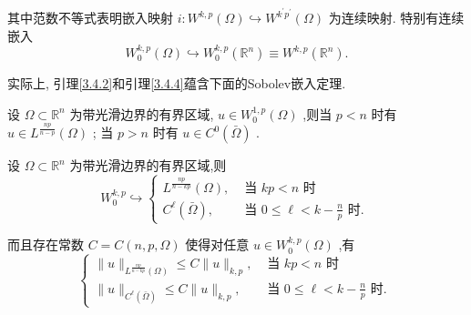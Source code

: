 \documentclass[lang=cn,newtx,10pt,scheme=chinese,thmcnt=chapter]{elegantbook}
\begin{document}
其中范数不等式表明嵌入映射 \(i : {W}^{k,p}\left( \Omega \right)  \hookrightarrow  {W}^{{k}^{\prime }{p}^{\prime }}\left( \Omega \right)\) 为连续映射. 特别有连续嵌入
\begin{equation*}
{W}_{0}^{k,p}\left( \Omega \right)  \hookrightarrow  {W}_{0}^{k,p}\left( {\mathbb{R}}^{n}\right)  \equiv  {W}^{k,p}\left( {\mathbb{R}}^{n}\right) .
\end{equation*}

实际上, 引理\ref{3.4.2}和引理\ref{3.4.4}蕴含下面的Sobolev嵌入定理.
\begin{theorem}\label{3.9}
    设 \(\Omega  \subset  {\mathbb{R}}^{n}\) 为带光滑边界的有界区域, \(u \in  {W}_{0}^{1,p}\left( \Omega \right)\) ,则当 \(p < n\) 时有 \(u \in  {L}^{\frac{np}{n - p}}\left( \Omega \right)\) ; 当 \(p > n\) 时有 \(u \in  {C}^{0}\left( \bar{\Omega }\right)\) .
\end{theorem}
\begin{theorem}
      设 \(\Omega  \subset  {\mathbb{R}}^{n}\) 为带光滑边界的有界区域,则
\begin{equation*}
{W}_{0}^{k,p} \hookrightarrow  \left\{  \begin{array}{ll} {L}^{\frac{np}{n - {kp}}}\left( \Omega \right) , & \text{ 当 }{kp} < n\text{ 时 } \\  {C}^{\ell }\left( \bar{\Omega }\right) , & \text{ 当 }0 \leqslant  \ell  < k - \frac{n}{p}\text{ 时. } \end{array}\right.
\end{equation*}

而且存在常数 \(C = C\left( {n,p,\Omega }\right)\) 使得对任意 \(u \in  {W}_{0}^{k,p}\left( \Omega \right)\) ,有
\begin{equation*}
\left\{  \begin{array}{ll} \parallel u{\parallel }_{{L}^{\frac{np}{n - {kp}}}\left( \Omega \right) } \leqslant  C\parallel u{\parallel }_{k,p}, & \text{ 当 }{kp} < n\text{ 时 } \\  \parallel u{\parallel }_{{C}^{\ell }\left( \bar{\Omega }\right) } \leqslant  C\parallel u{\parallel }_{k,p}, & \text{ 当 }0 \leqslant  \ell  < k - \frac{n}{p}\text{ 时. } \end{array}\right.
\end{equation*}

\end{theorem}
\end{document}
